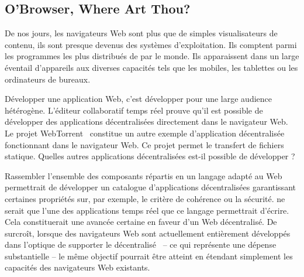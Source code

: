 \subsection{O'Browser, Where Art Thou?}

De nos jours, les navigateurs Web sont plus que de simples visualisateurs de
contenu, ils sont presque devenus des systèmes d'exploitation. Ils comptent
parmi les programmes les plus distribués de par le monde. Ils apparaissent dans
un large éventail d'appareils aux diverses capacités tels que les mobiles, les
tablettes ou les ordinateurs de bureaux.

Développer une application Web, c'est développer pour une large audience
hétérogène.  L'éditeur collaboratif temps réel \CRATE prouve qu'il est possible
de développer des applications décentralisées directement dans le navigateur
Web. Le projet WebTorrent~\cite{webtorrent} constitue un autre exemple
d'application décentralisée fonctionnant dans le navigateur Web. Ce projet
permet le transfert de fichiers statique. Quelles autres applications
décentralisées est-il possible de développer ?

Rassembler l'ensemble des composants répartis en un langage adapté au Web
permettrait de développer un catalogue d'applications décentralisées
garantissant certaines propriétés sur, par exemple, le critère de cohérence ou
la sécurité. \CRATE ne serait que l'une des applications temps réel que ce
langage permettrait d'écrire. Cela constituerait une avancée certaine en faveur
d'un Web décentralisé. De surcroît, lorsque des navigateurs Web sont
actuellement entièrement développés dans l'optique de supporter le
décentralisé~\cite{maelstrom} -- ce qui représente une dépense substantielle --
le même objectif pourrait être atteint en étendant simplement les capacités des
navigateurs Web existants.


